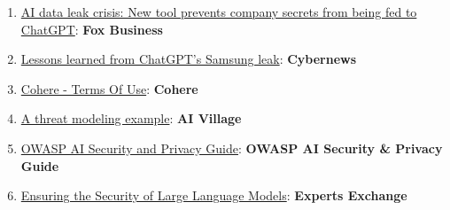\documentclass[
]{article}
\providecommand{\tightlist}{%
  \setlength{\itemsep}{0pt}\setlength{\parskip}{0pt}}
\begin{document}
\begin{enumerate}
\def\labelenumi{\arabic{enumi}.}
\tightlist
\item
  \href{https://www.foxbusiness.com/politics/ai-data-leak-crisis-prevent-company-secrets-chatgpt}{AI
  data leak crisis: New tool prevents company secrets from being fed to
  ChatGPT}: \textbf{Fox Business}
\item
  \href{https://cybernews.com/security/chatgpt-samsung-leak-explained-lessons/}{Lessons
  learned from ChatGPT's Samsung leak}: \textbf{Cybernews}
\item
  \href{https://cohere.com/terms-of-use}{Cohere - Terms Of Use}:
  \textbf{Cohere}
\item
  \href{https://aivillage.org/large\%20language\%20models/threat-modeling-llm/}{A
  threat modeling example}: \textbf{AI Village}
\item
  \href{https://owasp.org/www-project-ai-security-and-privacy-guide/}{OWASP
  AI Security and Privacy Guide}: \textbf{OWASP AI Security \& Privacy
  Guide}
\item
  \href{https://www.experts-exchange.com/articles/38220/Ensuring-the-Security-of-Large-Language-Models-Strategies-and-Best-Practices.html}{Ensuring
  the Security of Large Language Models}: \textbf{Experts Exchange}
\end{enumerate}
\end{document}
